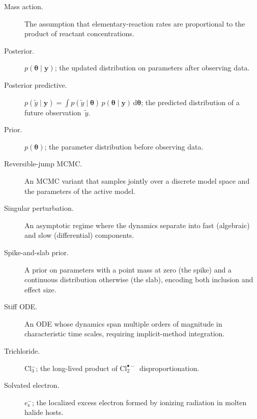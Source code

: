 \documentclass[12pt]{article}
\theoremstyle{plain}
\theoremstyle{definition}
\theoremstyle{remark}
\newcommand{\eS}{\ensuremath{e_{\mathrm{s}}^{-}}\xspace}
\newcommand{\Clt}{\ensuremath{\mathrm{Cl}_2^{\bullet-}}\xspace}
\renewcommand{\d}{\mathrm{d}}
\begin{document}
\begin{sloppypar}
\begin{description}
\item[Mass action.] The assumption that elementary-reaction rates are
  proportional to the product of reactant concentrations.
\item[Posterior.] $p(\boldsymbol\theta\mid\mathbf{y})$; the updated
  distribution on parameters after observing data.
\item[Posterior predictive.] $p(\tilde y\mid\mathbf{y}) =
  \int p(\tilde y\mid\boldsymbol\theta)\,p(\boldsymbol\theta\mid\mathbf{y})\,
  \d\boldsymbol\theta$; the predicted distribution of a future
  observation~$\tilde y$.
\item[Prior.] $p(\boldsymbol\theta)$; the parameter distribution before
  observing data.
\item[Reversible-jump MCMC.] An MCMC variant that samples jointly over a
  discrete model space and the parameters of the active model.
\item[Singular perturbation.] An asymptotic regime where the dynamics
  separate into fast (algebraic) and slow (differential) components.
\item[Spike-and-slab prior.] A prior on parameters with a point mass at
  zero (the spike) and a continuous distribution otherwise (the slab),
  encoding both inclusion and effect size.
\item[Stiff ODE.] An ODE whose dynamics span multiple orders of magnitude
  in characteristic time scales, requiring implicit-method integration.
\item[Trichloride.] Cl$_3^-$; the long-lived product of \Clt\ disproportionation.
\item[Solvated electron.] \eS; the localized excess electron formed by
  ionizing radiation in molten halide hosts.
\end{description}
\end{sloppypar}




\end{document}
